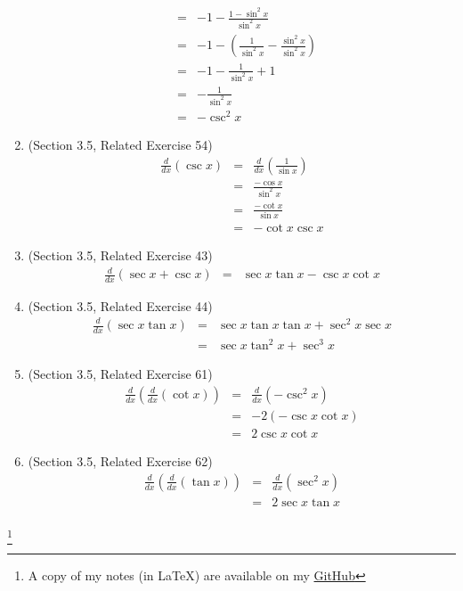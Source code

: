 \documentclass{article}
\newcommand\blfootnote[1]{
    \begingroup
    \renewcommand\thefootnote{}\footnote{#1}
    \addtocounter{footnote}{-1}
    \endgroup
}
\begin{document}
\begin{enumerate}
\begin{eqnarray}
                                             &=& - 1 - \frac{1 - \sin^2{x}}{\sin^2{x}} \\
                                             &=& - 1 - \left(\frac{1}{\sin^2{x}} - \frac{\sin^2{x}}{\sin^2{x}}\right) \\
                                             &=& - 1 - \frac{1}{\sin^2{x}} + 1 \\
                                             &=& - \frac{1}{\sin^2{x}} \\
                                             &=& - \csc^2{x}
        \end{eqnarray}
    \item (Section 3.5, Related Exercise 54)
        \begin{eqnarray}
            \frac{d}{dx}\left(\csc{x}\right) &=& \frac{d}{dx}\left(\frac{1}{\sin{x}}\right) \\
                                             &=& \frac{- \cos{x}}{\sin^2{x}} \\
                                             &=& \frac{- \cot{x}}{\sin{x}} \\
                                             &=& - \cot{x}\csc{x}
        \end{eqnarray}
    \item (Section 3.5, Related Exercise 43)
        \begin{eqnarray}
            \frac{d}{dx}\left(\sec{x} + \csc{x}\right) &=& \sec{x}\tan{x} - \csc{x}\cot{x}
        \end{eqnarray}
    \item (Section 3.5, Related Exercise 44)
        \begin{eqnarray}
            \frac{d}{dx}\left(\sec{x}\tan{x}\right) &=& \sec{x}\tan{x}\tan{x} + \sec^2{x}\sec{x} \\
            &=& \sec{x}\tan^2{x} + \sec^3{x}
        \end{eqnarray}
    \item (Section 3.5, Related Exercise 61)
        \begin{eqnarray}
            \frac{d}{dx}\left(\frac{d}{dx}\left(\cot{x}\right)\right) &=& \frac{d}{dx}\left(- \csc^2{x}\right) \\
                                                                      &=& - 2 \left(-\csc{x}\cot{x}\right) \\
                                                                      &=&  2\csc{x}\cot{x}
        \end{eqnarray}
    \item (Section 3.5, Related Exercise 62)
        \begin{eqnarray}
            \frac{d}{dx}\left(\frac{d}{dx}\left(\tan{x}\right)\right) &=& \frac{d}{dx}\left(\sec^2{x}\right) \\
                                                                      &=& 2\sec{x}\tan{x} \\
        \end{eqnarray}
\end{enumerate}

\blfootnote{A copy of my notes (in \LaTeX) are available on my \href{https://github.com/onlinechronically/MATH-211}{GitHub}}
\end{document}
